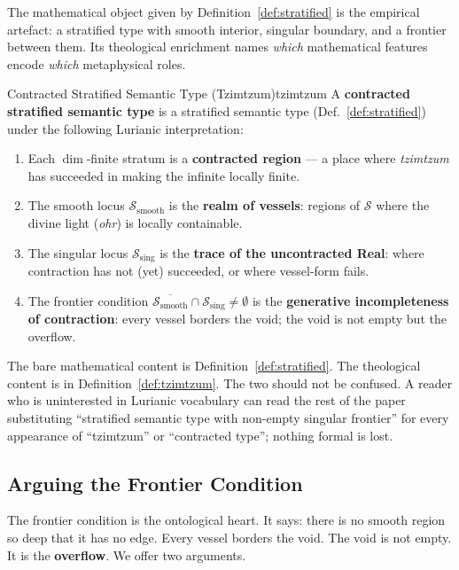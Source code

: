\documentclass[11pt,a4paper]{article}
\begin{document}
The mathematical object given by Definition~\ref{def:stratified} is the empirical artefact: a stratified type with smooth interior, singular boundary, and a frontier between them. Its theological enrichment names \emph{which} mathematical features encode \emph{which} metaphysical roles.

\begin{defbox}{Contracted Stratified Semantic Type (Tzimtzum)}{tzimtzum}
A \textbf{contracted stratified semantic type} is a stratified semantic type (Def.~\ref{def:stratified}) under the following Lurianic interpretation:
\begin{enumerate}
    \item Each $\dim$-finite stratum is a \textbf{contracted region} — a place where \emph{tzimtzum} has succeeded in making the infinite locally finite.
    \item The smooth locus $\mathcal{S}_{\mathrm{smooth}}$ is the \textbf{realm of vessels}: regions of $\mathcal{S}$ where the divine light (\emph{ohr}) is locally containable.
    \item The singular locus $\mathcal{S}_{\mathrm{sing}}$ is the \textbf{trace of the uncontracted Real}: where contraction has not (yet) succeeded, or where vessel-form fails.
    \item The frontier condition $\overline{\mathcal{S}_{\mathrm{smooth}}} \cap \mathcal{S}_{\mathrm{sing}} \neq \emptyset$ is the \textbf{generative incompleteness of contraction}: every vessel borders the void; the void is not empty but the overflow.
\end{enumerate}
\end{defbox}

The bare mathematical content is Definition~\ref{def:stratified}. The theological content is in Definition~\ref{def:tzimtzum}. The two should not be confused. A reader who is uninterested in Lurianic vocabulary can read the rest of the paper substituting ``stratified semantic type with non-empty singular frontier'' for every appearance of ``tzimtzum'' or ``contracted type''; nothing formal is lost.

\subsection{Arguing the Frontier Condition}

The frontier condition is the ontological heart. It says: there is no smooth region so deep that it has no edge. Every vessel borders the void. The void is not empty. It is the \textbf{overflow}. We offer two arguments.
\end{document}
